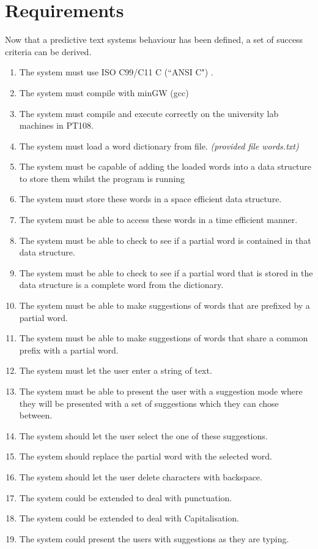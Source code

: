\documentclass[10pt]{article} %
\begin{document}
	\section{Requirements}
		Now that a predictive text systems behaviour has been defined, a set of success criteria can be derived.
		\begin{enumerate}
			\item The system must use ISO C99/C11 C (``ANSI C") .
			\item The system must compile with minGW (gcc)
			\item The system must compile and execute correctly on the university lab machines in PT108.
			\item The system must load a word dictionary from file. \textit{(provided file words.txt)}
			
			\item The system must be capable of adding the loaded words into a data structure to store them whilst the program is running
			\item The system must store these words in a space efficient data structure.
			\item The system must be able to access these words in a time efficient manner.
			
			\item The system must be able to check to see if a partial word is contained in that data structure.
			\item The system must be able to check to see if a partial word that is stored in the data structure is a complete word from the dictionary.
			\item The system must be able to make suggestions of words that are prefixed by a partial word.
			\item The system must be able to make suggestions of words that share a common prefix with a partial word.
			
			\item The system must let the user enter a string of text.
			\item The system must be able to present the user with a suggestion mode where they will be presented with a set of suggestions which they can chose between.
			
			\item The system should let the user select the one of these suggestions.
			\item The system should replace the partial word with the selected word.
			\item The system should let the user delete characters with backspace.

			\item The system could be extended to deal with punctuation.
			\item The system could be extended to deal with Capitalisation.
			\item The system could present the users with suggestions as they are typing.
			
		\end{enumerate}
\end{document}
